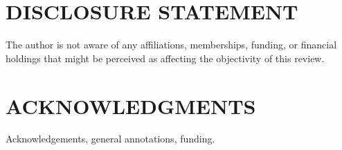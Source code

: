 \documentclass[a4paper]{ar-1col}
\begin{document}
\section*{DISCLOSURE STATEMENT}
The author is not aware of any affiliations, memberships, funding, or financial holdings that
might be perceived as affecting the objectivity of this review. 

\section*{ACKNOWLEDGMENTS}
Acknowledgements, general annotations, funding.





\end{document}
